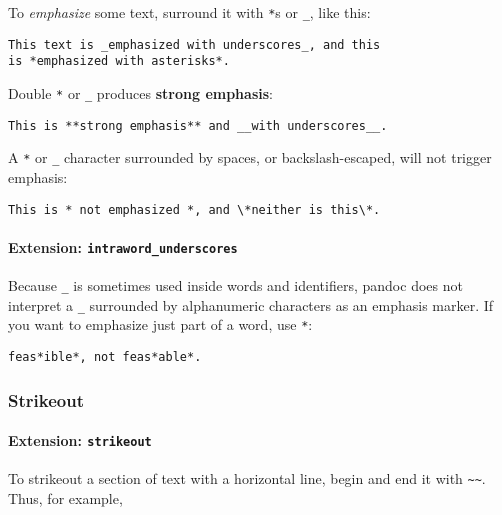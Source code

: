 \documentclass[]{article}
\begin{document}
To \emph{emphasize} some text, surround it with \texttt{*}s or
\texttt{\_}, like this:

\begin{verbatim}
This text is _emphasized with underscores_, and this
is *emphasized with asterisks*.
\end{verbatim}

Double \texttt{*} or \texttt{\_} produces \textbf{strong emphasis}:

\begin{verbatim}
This is **strong emphasis** and __with underscores__.
\end{verbatim}

A \texttt{*} or \texttt{\_} character surrounded by spaces, or
backslash-escaped, will not trigger emphasis:

\begin{verbatim}
This is * not emphasized *, and \*neither is this\*.
\end{verbatim}

\hypertarget{extension-intraword_underscores}{%
\paragraph{\texorpdfstring{Extension:
\texttt{intraword\_underscores}}{Extension: intraword\_underscores}}\label{extension-intraword_underscores}}

Because \texttt{\_} is sometimes used inside words and identifiers,
pandoc does not interpret a \texttt{\_} surrounded by alphanumeric
characters as an emphasis marker. If you want to emphasize just part of
a word, use \texttt{*}:

\begin{verbatim}
feas*ible*, not feas*able*.
\end{verbatim}

\hypertarget{strikeout}{%
\subsubsection{Strikeout}\label{strikeout}}

\hypertarget{extension-strikeout}{%
\paragraph{\texorpdfstring{Extension:
\texttt{strikeout}}{Extension: strikeout}}\label{extension-strikeout}}

To strikeout a section of text with a horizontal line, begin and end it
with \texttt{\textasciitilde{}\textasciitilde{}}. Thus, for example,
\end{document}
